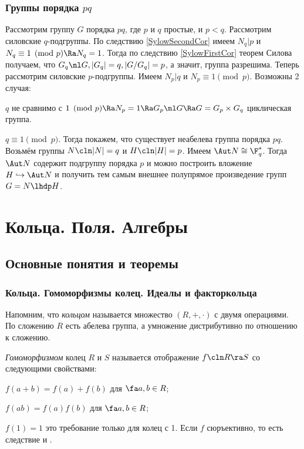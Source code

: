 \documentclass[a4paper]{article}
\begin{document}
\subsubsection{Группы порядка $pq$}

Рассмотрим группу $G$ порядка $pq$, где $p$ и $q$ простые, и $p < q$. Рассмотрим силовские $q$-подгруппы.
По следствию \ref{SylowSecondCor} имеем $N_q | p$ и $N_q \equiv 1 \pmod p \Ra N_q=1$. Тогда по следствию
\ref{SylowFirstCor} теорем Силова получаем, что $G_q \nl G, |G_q|=q,
|G/G_q|=p$, а значит, группа разрешима. Теперь рассмотрим силовские $p$-подгруппы. Имеем $N_p | q$ и $N_p \equiv
1 \pmod p$. Возможны 2 случая:

 $q$ не сравнимо с $1 \pmod p \Ra N_p=1 \Ra G_p \nl G \Ra G = G_p \times G_q$ циклическая группа.

 $q \equiv 1 \pmod p$. Тогда покажем, что существует неабелева группа порядка $pq$. Возьмём группы $N\cln |N|=q$ и $H\cln |H|=p$. Имеем $\Aut N \cong \F_q^*$. Тогда $\Aut N$ содержит подгруппу порядка $p$ и можно
построить вложение $H \hookrightarrow \Aut N$ и получить тем самым внешнее полупрямое произведение групп
$G=N\lhdp H$.

\section{Кольца. Поля. Алгебры}

\subsection{Основные понятия и теоремы}

\subsubsection{Кольца. Гомоморфизмы колец. Идеалы и факторкольца}

Напомним, что \emph{\emph{кольцом}} называется множество $(R, +, \cdot)$ с двумя операциями. По  сложению
$R$ есть абелева группа, а умножение дистрибутивно по отношению к сложению.

\begin{df}
\emph{Гомоморфизмом} колец $R$ и $S$ называется отображение $f\cln R \ra S$ со следующими свойствами:

 $f(a+b)=f(a)+f(b)$ для $\fa a,b \in R$;

 $f(ab)=f(a)f(b)$ для $\fa a,b \in R$;

 $f(1)=1$ это требование только для колец с 1. Если $f$ сюръективно, то  есть  следствие
 и .
\end{df}
\end{document}
